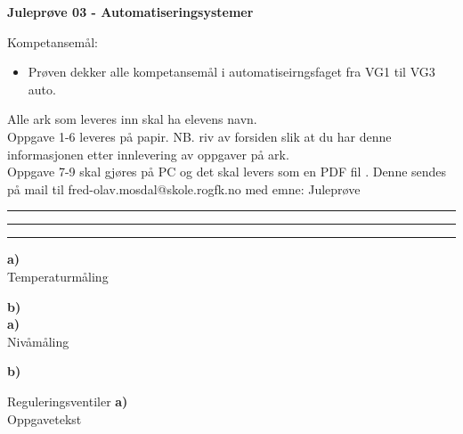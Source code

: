 
\huge
\centerline{\bf Juleprøve 03 - Automatiseringsystemer}  \bigskip
\normalsize


\vskip 3cm 
Kompetansemål:
\begin{itemize}[noitemsep]

	\item Prøven dekker alle kompetansemål i automatiseirngsfaget fra VG1 til VG3 auto.  
\end{itemize}

Alle ark som leveres inn skal ha elevens navn. \\ 

Oppgave 1-6 leveres på papir. NB. riv av forsiden slik at du har denne informasjonen etter innlevering av oppgaver på ark. \\

Oppgave 7-9 skal gjøres på PC og det skal levers som en PDF fil . Denne sendes på mail til fred-olav.mosdal@skole.rogfk.no med emne:
\vskip 5pt 
Juleprøve 

\bigskip 
\hrule
\vfil \eject
\hrule

\bigskip 
\hrule
\vfil \eject
\oppgave{}%
\textbf{a)}\\

Temperaturmåling
\vskip 1cm 


\textbf{b)}\\

\vfil \eject
\oppgave{}%
\textbf{a)}\\
Nivåmåling
\vskip 1cm 


\textbf{b)}
\vskip 1cm 

\vfil \eject
\oppgave{}%
Reguleringsventiler
\textbf{a)}\\
Oppgavetekst
\vskip 1cm 


